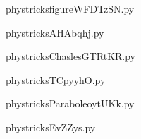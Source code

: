     \newcommand{\CaptionFigfigureWFDTzSN}{<+Type your caption here+>}
    \begin{center}
        
    \end{center}
    phystricksfigureWFDTzSN.py

    

    \clearpage
    


    \newcommand{\CaptionFigAHAbqhj}{<+Type your caption here+>}
    \begin{center}
        
    \end{center}
    phystricksAHAbqhj.py

    

    \clearpage
    


    \newcommand{\CaptionFigChaslesGTRtKR}{<+Type your caption here+>}
    \begin{center}
        
    \end{center}
    phystricksChaslesGTRtKR.py

    

    \clearpage
    


    \newcommand{\CaptionFigTCpyyhO}{<+Type your caption here+>}
    \begin{center}
        
    \end{center}
    phystricksTCpyyhO.py

    

    \clearpage
    


    \newcommand{\CaptionFigParaboleoytUKk}{<+Type your caption here+>}
    \begin{center}
        
    \end{center}
    phystricksParaboleoytUKk.py

    

    \clearpage
    


    \newcommand{\CaptionFigEvZZys}{<+Type your caption here+>}
    \begin{center}
        
    \end{center}
    phystricksEvZZys.py

